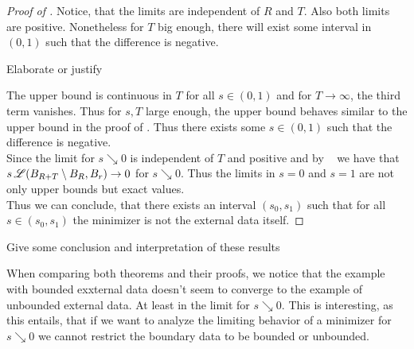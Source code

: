 \begin{proof}[Proof of ]
	Notice, that the limits are independent of \( R \) and \( T \). Also both limits are
	positive. Nonetheless for \( T  \) big enough, there will exist some interval in \(
	(0,1) \) such that the difference is negative. \\

	\begin{TODO}
		Elaborate or justify
	\end{TODO}
	The upper bound  is continuous in \( T \) for all \( s \in (0,1) \) and for
	\( T \to \infty \), the third term vanishes. Thus for \( s,T \) large enough, the upper
	bound behaves similar to the upper bound in the proof of . Thus there
	exists some \( s \in (0,1) \) such that the difference is negative. \\
	Since the limit for \( s \searrow 0 \) is independent of \( T \) and positive and by
	~\cite[Eq. (3.2)]{dipierro2012asymptotics} we have that \( s \operatorname{\mathscr{L}}(B_{R+T}\setminus B_{R}  , B_{r} ) \to 0 \) for \( s \searrow 0 \).
	Thus the limits in \( s = 0 \) and \( s=1 \) are not only upper bounds but exact values.
	\\

	Thus we can conclude, that there exists an interval \( (s_0, s_1) \) such that for all
	\( s \in (s_{0} , s_{1} ) \) the minimizer is not the external data itself.

\end{proof}

\begin{TODO}
	Give some conclusion and interpretation of these results
\end{TODO}

When comparing both theorems and their proofs, we notice that the example with bounded
exxternal data doesn't seem to converge to the example of unbounded external data. At
least in the limit for \( s \searrow 0 \). This is interesting, as this entails, that if
we want to analyze the limiting behavior of a minimizer for \( s \searrow 0 \) we cannot
restrict the boundary data to be bounded or unbounded.
